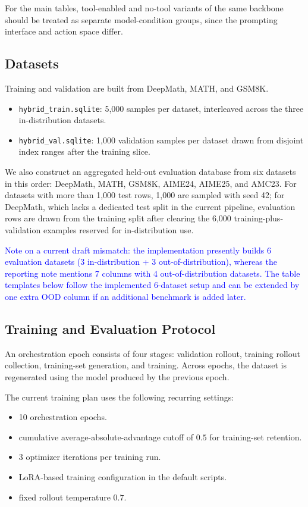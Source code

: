 \documentclass[letterpaper]{article} %
\newcommand{\draftnote}[1]{\textcolor{blue}{#1}}
\begin{document}
For the main tables, tool-enabled and no-tool variants of the same backbone should be treated as separate model-condition groups, since the prompting interface and action space differ.

\subsection{Datasets}
Training and validation are built from DeepMath, MATH, and GSM8K.
\begin{itemize}
    \item \texttt{hybrid\_train.sqlite}: 5{,}000 samples per dataset, interleaved across the three in-distribution datasets.
    \item \texttt{hybrid\_val.sqlite}: 1{,}000 validation samples per dataset drawn from disjoint index ranges after the training slice.
\end{itemize}

We also construct an aggregated held-out evaluation database from six datasets in this order: DeepMath, MATH, GSM8K, AIME24, AIME25, and AMC23. For datasets with more than 1{,}000 test rows, 1{,}000 are sampled with seed 42; for DeepMath, which lacks a dedicated test split in the current pipeline, evaluation rows are drawn from the training split after clearing the 6{,}000 training-plus-validation examples reserved for in-distribution use.

\draftnote{Note on a current draft mismatch: the implementation presently builds 6 evaluation datasets (3 in-distribution + 3 out-of-distribution), whereas the reporting note mentions 7 columns with 4 out-of-distribution datasets. The table templates below follow the implemented 6-dataset setup and can be extended by one extra OOD column if an additional benchmark is added later.}

\subsection{Training and Evaluation Protocol}
An orchestration epoch consists of four stages: validation rollout, training rollout collection, training-set generation, and training. Across epochs, the dataset is regenerated using the model produced by the previous epoch.

The current training plan uses the following recurring settings:
\begin{itemize}
    \item 10 orchestration epochs.
    \item cumulative average-absolute-advantage cutoff of $0.5$ for training-set retention.
    \item 3 optimizer iterations per training run.
    \item LoRA-based training configuration in the default scripts.
    \item fixed rollout temperature $0.7$.
\end{itemize}
\end{document}
